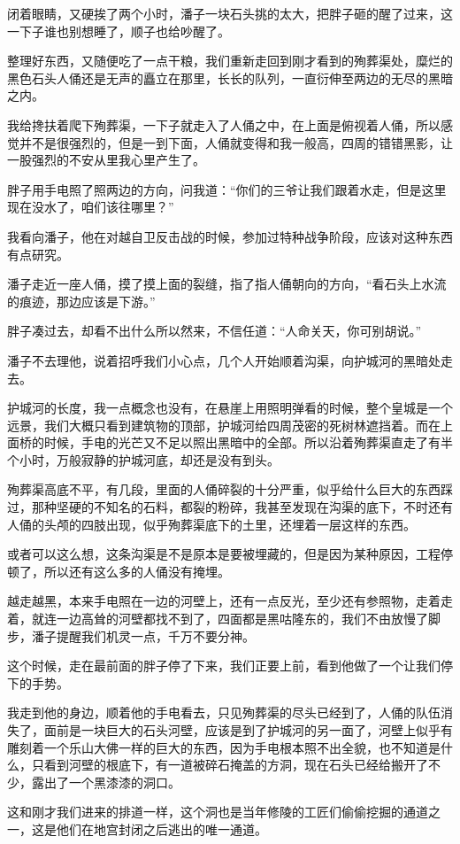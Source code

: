 闭着眼睛，又硬挨了两个小时，潘子一块石头挑的太大，把胖子砸的醒了过来，这一下子谁也别想睡了，顺子也给吵醒了。

整理好东西，又随便吃了一点干粮，我们重新走回到刚才看到的殉葬渠处，糜烂的黑色石头人俑还是无声的矗立在那里，长长的队列，一直衍伸至两边的无尽的黑暗之内。

我给搀扶着爬下殉葬渠，一下子就走入了人俑之中，在上面是俯视着人俑，所以感觉并不是很强烈的，但是一到下面，人俑就变得和我一般高，四周的错错黑影，让一股强烈的不安从里我心里产生了。

胖子用手电照了照两边的方向，问我道：“你们的三爷让我们跟着水走，但是这里现在没水了，咱们该往哪里？”

我看向潘子，他在对越自卫反击战的时候，参加过特种战争阶段，应该对这种东西有点研究。

潘子走近一座人俑，摸了摸上面的裂缝，指了指人俑朝向的方向，“看石头上水流的痕迹，那边应该是下游。”

胖子凑过去，却看不出什么所以然来，不信任道：“人命关天，你可别胡说。”

潘子不去理他，说着招呼我们小心点，几个人开始顺着沟渠，向护城河的黑暗处走去。

护城河的长度，我一点概念也没有，在悬崖上用照明弹看的时候，整个皇城是一个远景，我们大概只看到建筑物的顶部，护城河给四周茂密的死树林遮挡着。而在上面桥的时候，手电的光芒又不足以照出黑暗中的全部。所以沿着殉葬渠直走了有半个小时，万般寂静的护城河底，却还是没有到头。

殉葬渠高底不平，有几段，里面的人俑碎裂的十分严重，似乎给什么巨大的东西踩过，那种坚硬的不知名的石料，都裂的粉碎，我甚至发现在沟渠的底下，不时还有人俑的头颅的四肢出现，似乎殉葬渠底下的土里，还埋着一层这样的东西。

或者可以这么想，这条沟渠是不是原本是要被埋藏的，但是因为某种原因，工程停顿了，所以还有这么多的人俑没有掩埋。

越走越黑，本来手电照在一边的河壁上，还有一点反光，至少还有参照物，走着走着，就连一边高耸的河壁都找不到了，四面都是黑咕隆东的，我们不由放慢了脚步，潘子提醒我们机灵一点，千万不要分神。

这个时候，走在最前面的胖子停了下来，我们正要上前，看到他做了一个让我们停下的手势。

我走到他的身边，顺着他的手电看去，只见殉葬渠的尽头已经到了，人俑的队伍消失了，面前是一块巨大的石头河壁，应该是到了护城河的另一面了，河壁上似乎有雕刻着一个乐山大佛一样的巨大的东西，因为手电根本照不出全貌，也不知道是什么，只看到河壁的根底下，有一道被碎石掩盖的方洞，现在石头已经给搬开了不少，露出了一个黑漆漆的洞口。

这和刚才我们进来的排道一样，这个洞也是当年修陵的工匠们偷偷挖掘的通道之一，这是他们在地宫封闭之后逃出的唯一通道。

